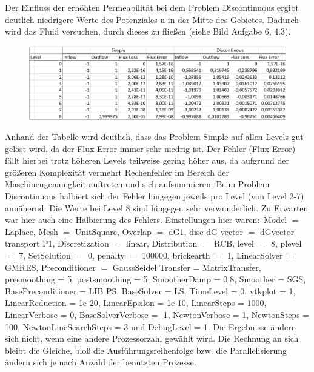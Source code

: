\documentclass[12pt,a4paper]{scrartcl}
\numberwithin{equation}{section}
\begin{document}
\begin{enumerate}[label=(\roman*)]
%
Der Einfluss der erhöhten Permeabilität bei dem Problem Discontinuous ergibt deutlich niedrigere Werte des Potenziales u in der Mitte des Gebietes. Dadurch wird das Fluid versuchen, durch dieses zu fließen (siehe Bild Aufgabe 6, 4.3).
\begin{figure}[H]
	\centering
	\captionabove{}
	\includegraphics[width=\textwidth]{../A4Tabelle.png}
\end{figure}
Anhand der Tabelle wird deutlich, dass das Problem Simple auf allen Levels gut gelöst wird, da der Flux Error immer sehr niedrig ist. Der Fehler (Flux Error) fällt hierbei trotz höheren Levels teilweise gering höher aus, da aufgrund der größeren Komplexität vermehrt Rechenfehler im Bereich der Maschinengenauigkeit auftreten und sich aufsummieren. 
\newline Beim Problem Discontinuous halbiert sich der Fehler hingegen jeweils pro Level (von Level 2-7)
 annähernd. Die Werte bei Level 8 sind hingegen sehr verwunderlich. Zu Erwarten war hier auch eine Halbierung des Fehlers. \newline
Einstellungen hier waren$:$
\newline
 Model $=$ Laplace, Mesh $=$ UnitSquare, Overlap $=$ dG1,
  disc dG vector $=$
dGvector transport P1, Discretization $=$ linear,
  Distribution $=$ RCB, level $=$ 8, plevel $=$ 7, SetSolution $=$ 0, penalty $=$ 100000, brickearth $=$ 1, LinearSolver $=$ GMRES, Preconditioner $=$ GaussSeidel
Transfer = MatrixTransfer, 
presmoothing = 5, 
postsmoothing = 5, 
SmootherDamp = 0.8, 
Smoother = SGS, 
BasePreconditioner = LIB PS, 
BaseSolver = LS, 
TimeLevel = 0, 
vtkplot = 1, 
LinearReduction = 1e-20, 
LinearEpsilon = 1e-10, 
LinearSteps = 1000, 
LinearVerbose = 0, 
BaseSolverVerbose = -1, 
NewtonVerbose = 1, 
NewtonSteps = 100, 
NewtonLineSearchSteps = 3 und 
DebugLevel = 1.
\newline 
Die Ergebnisse ändern sich nicht, wenn eine andere Prozessorzahl gewählt wird. Die Rechnung an sich bleibt die Gleiche, bloß die Ausführungsreihenfolge bzw. die Parallelisierung ändern sich je nach Anzahl der benutzten Prozesse. 
\end{enumerate}
\end{document}
